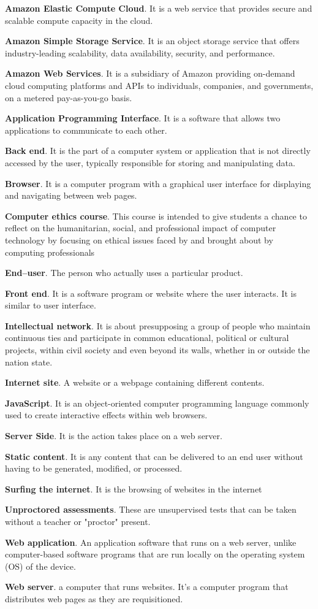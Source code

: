 \textbf{Amazon Elastic Compute Cloud}.
It is a web service that provides secure and scalable compute capacity in the cloud.

\textbf{Amazon Simple Storage Service}.
It is an object storage service that offers industry-leading scalability, data availability, security, and performance.

\textbf{Amazon Web Services}.
It is a subsidiary of Amazon providing on-demand cloud computing platforms and APIs to individuals, companies, and governments, on a metered pay-as-you-go basis.

\textbf{Application Programming Interface}.
It is a software that allows two applications to communicate to each other.

\textbf{Back end}.
It is the part of a computer system or application that is not directly accessed by the user, typically responsible for storing and manipulating data.

\textbf{Browser}.
It is a computer program with a graphical user interface for displaying and navigating between web pages.

\textbf{Computer ethics course}.
This course is intended to give students a chance to reflect on the humanitarian, social, and professional impact of computer technology by focusing on ethical issues faced by and brought about by computing professionals

\textbf{End–user}.
The person who actually uses a particular product.

\textbf{Front end}.
It is a software program or website where the user interacts. It is similar to user interface.

\textbf{Intellectual network}.
It is about presupposing a group of people who maintain continuous ties and participate in common educational, political or cultural projects, within civil society and even beyond its walls, whether in or outside the nation state.

\textbf{Internet site}.
A website or a webpage containing different contents.

\textbf{JavaScript}.
It is an object-oriented computer programming language commonly used to create interactive effects within web browsers.

\textbf{Server Side}.
It is the action takes place on a web server.

\textbf{Static content}.
It is any content that can be delivered to an end user without having to be generated, modified, or processed.

\textbf{Surfing the internet}.
It is the browsing of websites in the internet

\textbf{Unproctored assessments}.
These are unsupervised tests that can be taken without a teacher or "proctor" present.

\textbf{Web application}.
An application software that runs on a web server, unlike computer-based software programs that are run locally on the operating system (OS) of the device.

\textbf{Web server}.
a computer that runs websites. It's a computer program that distributes web pages as they are requisitioned.
